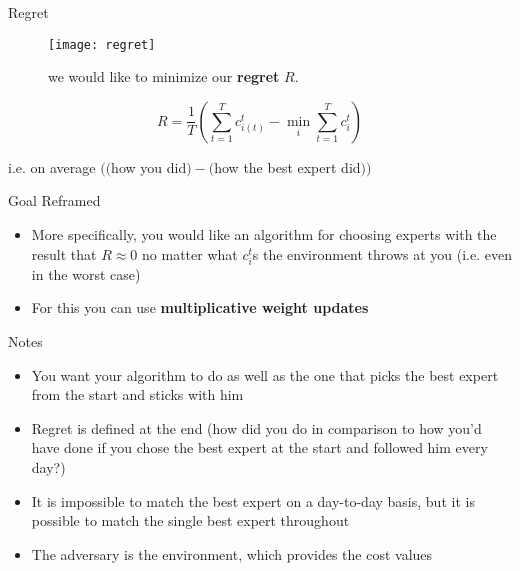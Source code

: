 \documentclass[10pt]{beamer}
\begin{document}
\begin{frame}[fragile]{Regret}

\begin{figure}
  \texttt{[image: regret]}
  \caption{we would like to minimize our \textbf{regret} $R$.}
\end{figure}
\vspace*{-5mm}
$$R = \frac{1}{T}\left(\sum_{t = 1}^T c_{i(t)}^t - \min_i\sum_{t = 1}^T c_i^t\right)$$
\vspace*{-6mm}
\begin{center}
i.e. on average $(($how you did$) - ($how the best expert did$))$
\end{center}

\end{frame}

\begin{frame}[fragile]{Goal Reframed}

\begin{itemize}
\item More specifically, you would like an algorithm for choosing experts with the result that $R \approx 0$ no matter what $c_i^t$s the environment throws at you (i.e. even in the worst case)
\item For this you can use \textbf{multiplicative weight updates}
\end{itemize}

\end{frame}

\begin{frame}[fragile]{Notes}

\begin{itemize}
\item You want your algorithm to do as well as the one that picks the best expert from the start and sticks with him
\item Regret is defined at the end (how did you do in comparison to how you'd have done if you chose the best expert at the start and followed him every day?)
\item It is impossible to match the best expert on a day-to-day basis, but it is possible to match the single best expert throughout
\item The adversary is the environment, which provides the cost values
\end{itemize}

\end{frame}
\end{document}
